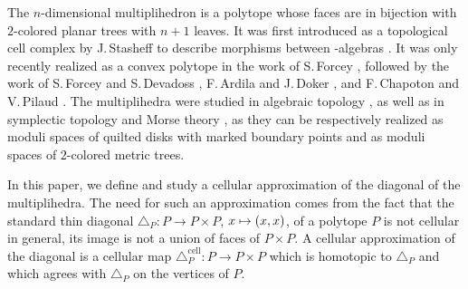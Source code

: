 \documentclass[JEP,XML,SOM,NoFloatCountersInSection,Unicode,published]{cedram}
\def\mto{\mathchoice{\longmapsto}{\mapsto}{\mapsto}{\mapsto}}
\theoremstyle{definition}
\theoremstyle{plain}
\begin{document}
The $n$-dimensional multiplihedron is a polytope whose faces are in bijection with $2$-colored planar trees with $n+1$ leaves. It was first introduced as a topological cell complex by J.\,Stasheff to describe morphisms between \Ainf-algebras \cite{Stasheff70}.
It was only recently realized as a convex polytope in the work of S.\,Forcey \cite{Forcey08}, followed by the work of S.\,Forcey and S.\,Devadoss \cite{DevadossForcey08}, F.\,Ardila and J.\,Doker \cite{AD13}, and F.\,Chapoton and V.\,Pilaud \cite{CP22}.
The multiplihedra were studied in algebraic topology \cite{BoardmanVogt73}, as well as in symplectic topology \cite{MauWoodward10,mau-wehrheim-woodward} and Morse theory \cite{mazuir-I,mazuir-II}, as they can be respectively realized as moduli spaces of quilted disks with marked boundary points and as moduli spaces of $2$-colored metric trees.

In this paper, we define and study a cellular approximation of the diagonal of the multiplihedra.
The need for such an approximation comes from the fact that the standard thin diagonal $\triangle_P:P\to P\times P$, $x\mto (x,x)$, of a polytope $P$ is not cellular in general, \ie its image is not a union of faces of $P\times P$.
A cellular approximation of the diagonal is a cellular map $\triangle_P^{\textrm{cell}} : P \to P\times P$ which is homotopic to $\triangle_P$ and which agrees with $\triangle_P$ on the vertices of $P$.
\end{document}
